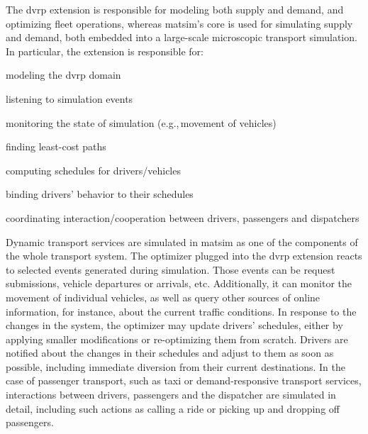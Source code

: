 The \gls{dvrp} extension is responsible for modeling both supply and demand, and optimizing fleet operations, whereas \gls{matsim}'s core is used for simulating supply and demand, both embedded into a large-scale microscopic transport simulation. In particular, the extension is responsible for:
%
\begin{compactitem}
	\item modeling the \gls{dvrp} domain
	\item listening to simulation events
	\item monitoring the state of simulation (e.g.,\,movement of vehicles)
	\item finding least-cost paths
	\item computing schedules for drivers/vehicles
	\item binding drivers' behavior to their schedules
	\item coordinating interaction/cooperation between drivers, passengers and dispatchers
\end{compactitem}

Dynamic transport services are simulated in \gls{matsim} as one of the components of the whole transport system. The optimizer plugged into the \gls{dvrp} extension reacts to selected events generated during simulation. Those events can be request submissions, vehicle departures or arrivals, etc. Additionally, it can monitor the movement of individual vehicles, as well as query other sources of online information, for instance, about the current traffic conditions. In response to the changes in the system, the optimizer may update drivers' schedules, either by applying smaller modifications or re-optimizing them from scratch. Drivers are notified about the changes in their schedules and adjust to them as soon as possible, including immediate diversion from their current destinations. In the case of passenger transport, such as taxi or demand-responsive transport services, interactions between drivers, passengers and the dispatcher are simulated in detail, including such actions as calling a ride or picking up and dropping off passengers.

